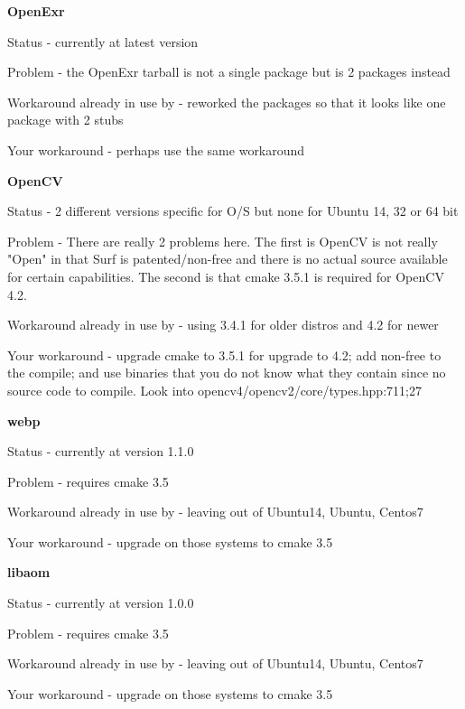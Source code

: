 \textbf{OpenExr} 
\begin{description}[noitemsep]
     \item Status - currently at latest version 
     \item Problem - the OpenExr tarball is not a single package but is 2 packages instead
     \item Workaround already in use by \CGG{} - reworked the packages so that it looks like
one package with 2 stubs
     \item Your workaround - perhaps use the same workaround
\end{description}

\textbf{OpenCV}
\begin{description}[noitemsep]
     \item Status - 2 different versions specific for O/S but none for Ubuntu 14, 32 or 64 bit
     \item Problem - There are really 2 problems here.  The first is OpenCV is not really
"Open" in that Surf is patented/non-free and there is no actual source available for certain
capabilities. The second is that cmake 3.5.1 is required for OpenCV 4.2.
     \item Workaround already in use by \CGG{} - using 3.4.1 for older distros and 4.2 for newer
     \item Your workaround - upgrade cmake to 3.5.1 for upgrade to 4.2; add non-free to the
compile; and use binaries that you do not know what they contain since no source code to compile.
Look into opencv4/opencv2/core/types.hpp:711;27
\end{description}

\textbf{webp}
\begin{description}[noitemsep]
     \item Status - currently at version 1.1.0
     \item Problem - requires cmake 3.5 
     \item Workaround already in use by \CGG{} - leaving out of Ubuntu14, Ubuntu, Centos7
     \item Your workaround - upgrade on those systems to cmake 3.5
\end{description}

\textbf{libaom}
\begin{description}[noitemsep]
     \item Status - currently at version 1.0.0 
     \item Problem - requires cmake 3.5 
     \item Workaround already in use by \CGG{} - leaving out of Ubuntu14, Ubuntu, Centos7
     \item Your workaround - upgrade on those systems to cmake 3.5
\end{description}


